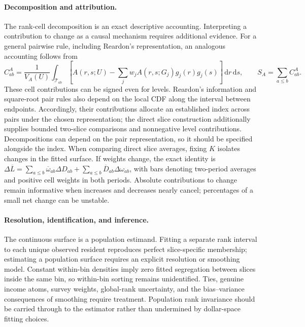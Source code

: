 \documentclass[11pt]{article}
\newcommand{\dd}{\,\mathrm{d}}
\newcommand{\T}{\mathcal{T}}
\begin{document}
\paragraph{Decomposition and attribution.}
The rank-cell decomposition is an exact descriptive accounting. Interpreting a contribution to change as a causal mechanism requires additional evidence. For a general pairwise rule, including Reardon's representation, an analogous accounting follows from
\begin{equation}
C^A_{ab}=\frac{1}{V_A(U)}\int_{\T_{ab}}
\left[A(r,s;U)-\sum_jw_j A(r,s;G_j)g_j(r)g_j(s)\right]\dd r\dd s,
\qquad S_A=\sum_{a\leq b}C^A_{ab}.
\label{eq:general-decomposition}
\end{equation}
These cell contributions can be signed even for levels. Reardon's information and square-root pair rules also depend on the local CDF along the interval between endpoints. Accordingly, their contributions allocate an established index across pairs under the chosen representation; the direct slice construction additionally supplies bounded two-slice comparisons and nonnegative level contributions. Decompositions can depend on the pair representation, so it should be specified alongside the index. When comparing direct slice averages, fixing $K$ isolates changes in the fitted surface. If weights change, the exact identity is $\Delta\overline L=\sum_{a\leq b}\overline\omega_{ab}\Delta D_{ab}+\sum_{a\leq b}\overline D_{ab}\Delta\omega_{ab}$, with bars denoting two-period averages and positive cell weights in both periods. Absolute contributions to change remain informative when increases and decreases nearly cancel; percentages of a small net change can be unstable.

\paragraph{Resolution, identification, and inference.}
The continuous surface is a population estimand. Fitting a separate rank interval to each unique observed resident reproduces perfect slice-specific membership; estimating a population surface requires an explicit resolution or smoothing model. Constant within-bin densities imply zero fitted segregation between slices inside the same bin, so within-bin sorting remains unidentified. Ties, genuine income atoms, survey weights, global-rank uncertainty, and the bias--variance consequences of smoothing require treatment. Population rank invariance should be carried through to the estimator rather than undermined by dollar-space fitting choices.
\end{document}
